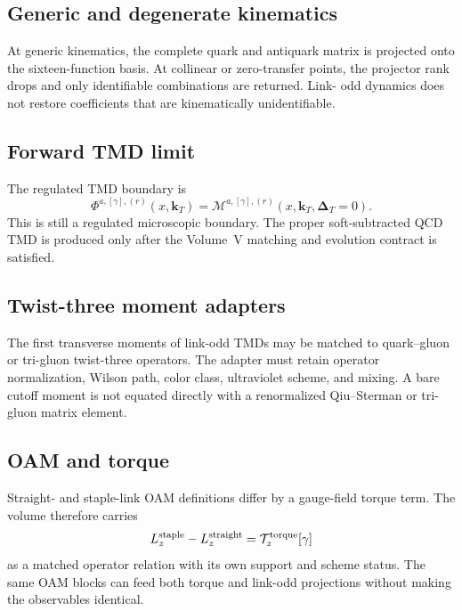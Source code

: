 \documentclass[11pt]{article}
\newcommand{\kT}{\bm{k}_{T}}
\newcommand{\DT}{\bm{\Delta}_{T}}
\newcommand{\cM}{\mathcal M}
\newcommand{\cT}{\mathcal T}
\begin{document}
\subsection{Generic and degenerate kinematics}

At generic kinematics, the complete quark and antiquark matrix is projected
onto the sixteen-function basis.  At collinear or zero-transfer points, the
projector rank drops and only identifiable combinations are returned.  Link-
odd dynamics does not restore coefficients that are kinematically
unidentifiable.

\subsection{Forward TMD limit}

The regulated TMD boundary is
\begin{equation}
 \Phi^{a,[\gamma],(r)}(x,\kT)
 =\cM^{a,[\gamma],(r)}(x,\kT,\DT=0).
 \label{eq:tmd-limit-wilson}
\end{equation}
This is still a regulated microscopic boundary.  The proper soft-subtracted
QCD TMD is produced only after the Volume~V matching and evolution contract is
satisfied.

\subsection{Twist-three moment adapters}

The first transverse moments of link-odd TMDs may be matched to quark--gluon or
tri-gluon twist-three operators.  The adapter must retain operator
normalization, Wilson path, color class, ultraviolet scheme, and mixing.  A
bare cutoff moment is not equated directly with a renormalized Qiu--Sterman or
tri-gluon matrix element.

\subsection{OAM and torque}

Straight- and staple-link OAM definitions differ by a gauge-field torque term.
The volume therefore carries
\begin{equation}
 L_z^{\rm staple}-L_z^{\rm straight}
 =\cT_z^{\rm torque}[\gamma]
 \label{eq:oam-torque}
\end{equation}
as a matched operator relation with its own support and scheme status.  The
same OAM blocks can feed both torque and link-odd projections without making
the observables identical.
\end{document}
